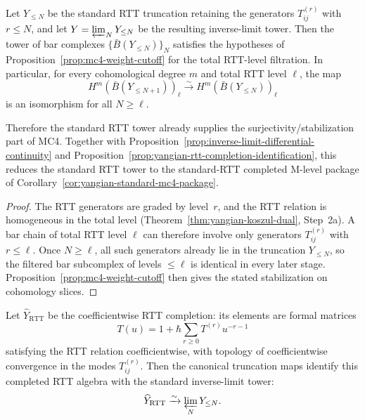 \begin{corollary}
\label{cor:yangian-weight-cutoff}
Let $Y_{\le N}$ be the standard RTT truncation retaining the generators
$T_{ij}^{(r)}$ with $r \le N$, and let
$Y = \varprojlim_N Y_{\le N}$ be the resulting inverse-limit tower.
Then the tower of bar complexes $\{\bar B(Y_{\le N})\}_N$ satisfies the
hypotheses of Proposition~\ref{prop:mc4-weight-cutoff} for the total
RTT-level filtration. In particular, for every cohomological degree
$m$ and total RTT level $\ell$, the map
\[
H^m(\bar B(Y_{\le N+1}))_\ell \xrightarrow{\sim}
H^m(\bar B(Y_{\le N}))_\ell
\]
is an isomorphism for all $N \ge \ell$.

Therefore the standard RTT tower already supplies the
surjectivity/stabilization part of MC4. Together with
Proposition~\ref{prop:inverse-limit-differential-continuity} and
Proposition~\ref{prop:yangian-rtt-completion-identification}, this
reduces the standard RTT tower to the standard-RTT completed M-level
package of Corollary~\ref{cor:yangian-standard-mc4-package}.
\end{corollary}

\begin{proof}
The RTT generators are graded by level~$r$, and the RTT relation is
homogeneous in the total level (Theorem~\ref{thm:yangian-koszul-dual},
Step~2a). A bar chain of total RTT level $\ell$ can therefore involve
only generators $T_{ij}^{(r)}$ with $r \le \ell$. Once $N \ge \ell$,
all such generators already lie in the truncation $Y_{\le N}$, so the
filtered bar subcomplex of levels $\le \ell$ is identical in every
later stage. Proposition~\ref{prop:mc4-weight-cutoff} then gives the
stated stabilization on cohomology slices.
\end{proof}

\begin{proposition}
\label{prop:yangian-rtt-completion-identification}
Let $\widehat Y_{\mathrm{RTT}}$ be the coefficientwise RTT completion:
its elements are formal matrices
\[
T(u)=1+\hbar\sum_{r \ge 0} T^{(r)}u^{-r-1}
\]
satisfying the RTT relation coefficientwise, with topology of
coefficientwise convergence in the modes $T_{ij}^{(r)}$. Then the
canonical truncation maps identify this completed RTT algebra with the
standard inverse-limit tower:
\[
\widehat Y_{\mathrm{RTT}} \xrightarrow{\sim} \varprojlim_N Y_{\le N}.
\]
\end{proposition}


